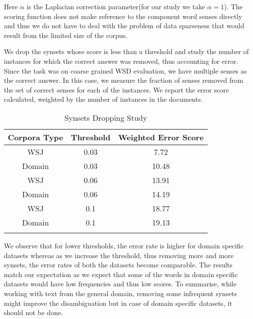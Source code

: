 Here $\alpha$ is the Laplacian correction parameter(for our study we take $\alpha=1$).
The scoring function does not make reference to the component word senses directly and thus we do not have to deal with the problem of data sparseness that would result from the limited size of the corpus.

We drop the synsets whose score is less than a threshold and study the number of instances for which the correct answer was removed, thus accounting for error. Since the task was on coarse grained WSD evaluation, we have multiple senses as the correct answer. In this case, we measure the fraction of senses removed from the set of correct senses for each of the instances. We report the error score calculated, weighted by the number of instances in the documents.

\begin{center}
\begin{longtable}{| c | c | c |}  
\hline
\textbf{Corpora Type} & \textbf{Threshold} & \textbf{Weighted Error Score} \\ \hline
WSJ & 0.03 & 7.72 \\ \hline
Domain & 0.03 & 10.48 \\ \hline
WSJ & 0.06 & 13.91 \\ \hline
Domain & 0.06 & 14.19 \\ \hline
WSJ & 0.1 & 18.77 \\ \hline
Domain & 0.1 & 19.13 \\ \hline
\caption{Synsets Dropping Study}
\label{tab:synsetsDroppingStudy}
\end{longtable}
\end{center}

We observe that for lower thresholds, the error rate is higher for domain specific datasets whereas as we increase the threshold, thus removing more and more synsets, the error rates of both the datasets become comparable. The results match our expectation as we expect that some of the words in domain specific datasets would have low frequencies and thus low scores. To summarise, while working with text from the general domain, removing some infrequent synsets might improve the disambiguation but in case of domain specific datasets, it should not be done.

